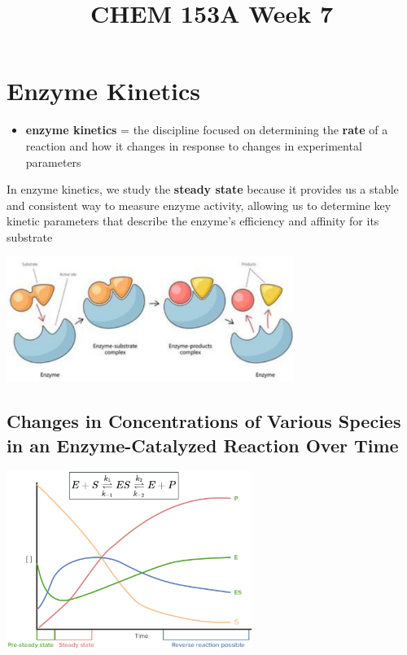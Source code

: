 \documentclass[10pt]{article}
\title{CHEM 153A Week 7}
\begin{document}
\maketitle

\section*{Enzyme Kinetics}
\begin{itemize}
    \item \textbf{enzyme kinetics} = the discipline focused on determining the \textbf{rate} of a reaction and how it changes in response to changes in experimental parameters
\end{itemize}
In enzyme kinetics, we study the \textbf{steady state} because it provides us a stable and consistent way to measure enzyme activity, allowing us to determine key kinetic parameters that describe the enzyme's efficiency and affinity for its substrate
\begin{center}
    \includegraphics*[width=0.7\textwidth]{L1_1.png}
\end{center}

\subsection*{Changes in Concentrations of Various Species in an Enzyme-Catalyzed Reaction Over Time}
\begin{center}
    \includegraphics*[width=0.6\textwidth]{L1_2.png}
\end{center}
\end{document}
